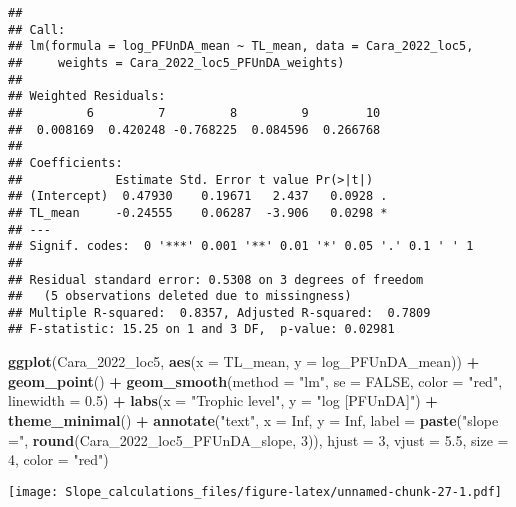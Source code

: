 \documentclass[
]{article}
\newenvironment{Shaded}{\begin{snugshade}}{\end{snugshade}}
\newcommand{\AttributeTok}[1]{\textcolor[rgb]{0.13,0.29,0.53}{#1}}
\newcommand{\ConstantTok}[1]{\textcolor[rgb]{0.56,0.35,0.01}{#1}}
\newcommand{\DecValTok}[1]{\textcolor[rgb]{0.00,0.00,0.81}{#1}}
\newcommand{\FloatTok}[1]{\textcolor[rgb]{0.00,0.00,0.81}{#1}}
\newcommand{\FunctionTok}[1]{\textcolor[rgb]{0.13,0.29,0.53}{\textbf{#1}}}
\newcommand{\NormalTok}[1]{#1}
\newcommand{\SpecialCharTok}[1]{\textcolor[rgb]{0.81,0.36,0.00}{\textbf{#1}}}
\newcommand{\StringTok}[1]{\textcolor[rgb]{0.31,0.60,0.02}{#1}}
\begin{document}
\begin{verbatim}
## 
## Call:
## lm(formula = log_PFUnDA_mean ~ TL_mean, data = Cara_2022_loc5, 
##     weights = Cara_2022_loc5_PFUnDA_weights)
## 
## Weighted Residuals:
##         6         7         8         9        10 
##  0.008169  0.420248 -0.768225  0.084596  0.266768 
## 
## Coefficients:
##             Estimate Std. Error t value Pr(>|t|)  
## (Intercept)  0.47930    0.19671   2.437   0.0928 .
## TL_mean     -0.24555    0.06287  -3.906   0.0298 *
## ---
## Signif. codes:  0 '***' 0.001 '**' 0.01 '*' 0.05 '.' 0.1 ' ' 1
## 
## Residual standard error: 0.5308 on 3 degrees of freedom
##   (5 observations deleted due to missingness)
## Multiple R-squared:  0.8357, Adjusted R-squared:  0.7809 
## F-statistic: 15.25 on 1 and 3 DF,  p-value: 0.02981
\end{verbatim}

\begin{Shaded}
\begin{Highlighting}[]
\FunctionTok{ggplot}\NormalTok{(Cara\_2022\_loc5, }\FunctionTok{aes}\NormalTok{(}\AttributeTok{x =}\NormalTok{ TL\_mean, }\AttributeTok{y =}\NormalTok{ log\_PFUnDA\_mean)) }\SpecialCharTok{+}
  \FunctionTok{geom\_point}\NormalTok{() }\SpecialCharTok{+}
  \FunctionTok{geom\_smooth}\NormalTok{(}\AttributeTok{method =} \StringTok{"lm"}\NormalTok{, }\AttributeTok{se =} \ConstantTok{FALSE}\NormalTok{, }\AttributeTok{color =} \StringTok{"red"}\NormalTok{, }\AttributeTok{linewidth =} \FloatTok{0.5}\NormalTok{) }\SpecialCharTok{+}
  \FunctionTok{labs}\NormalTok{(}\AttributeTok{x =} \StringTok{"Trophic level"}\NormalTok{,}
       \AttributeTok{y =} \StringTok{"log [PFUnDA]"}\NormalTok{) }\SpecialCharTok{+}
  \FunctionTok{theme\_minimal}\NormalTok{() }\SpecialCharTok{+}
  \FunctionTok{annotate}\NormalTok{(}\StringTok{"text"}\NormalTok{, }\AttributeTok{x =} \ConstantTok{Inf}\NormalTok{, }\AttributeTok{y =} \ConstantTok{Inf}\NormalTok{, }\AttributeTok{label =} \FunctionTok{paste}\NormalTok{(}\StringTok{"slope ="}\NormalTok{, }\FunctionTok{round}\NormalTok{(Cara\_2022\_loc5\_PFUnDA\_slope, }\DecValTok{3}\NormalTok{)), }
           \AttributeTok{hjust =} \DecValTok{3}\NormalTok{, }\AttributeTok{vjust =} \FloatTok{5.5}\NormalTok{, }\AttributeTok{size =} \DecValTok{4}\NormalTok{, }\AttributeTok{color =} \StringTok{"red"}\NormalTok{)}
\end{Highlighting}
\end{Shaded}

\texttt{[image: Slope\_calculations\_files/figure-latex/unnamed-chunk-27-1.pdf]}
\end{document}
